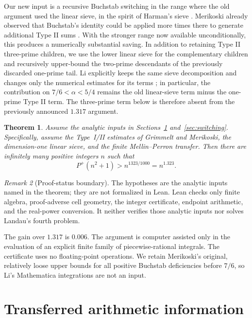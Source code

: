 \documentclass[10pt,reqno]{amsart}
\newcommand{\Pplus}{P^{+}}
\newcommand{\1}{\mathbf{1}}
\theoremstyle{plain}
\newtheorem{theorem}{Theorem}[section]
\theoremstyle{remark}
\newtheorem{remark}[theorem]{Remark}
\begin{document}
Our new input is a recursive Buchstab switching in the range where the old
argument used the linear sieve, in the spirit of Harman's sieve
\cite{Harman2007}.  Merikoski already observed that Buchstab's
identity could be applied more times there to generate additional Type II
sums \cite[Remark 12]{Merikoski2020}.  With the stronger range now available
unconditionally, this produces a numerically substantial saving.  In
addition to retaining Type II three-prime children, we use the lower linear
sieve for the complementary children and recursively upper-bound the
two-prime descendants of the previously discarded one-prime tail.
Li explicitly keeps the same sieve decomposition and changes only the
numerical estimates for its terms \cite[Lemmas 2.1 and 2.2]{Li2025}; in particular,
the contribution on $7/6<\alpha<5/4$ remains the old linear-sieve term minus
the one-prime Type II term.  The three-prime term below is therefore absent
from the previously announced $1.317$ argument.

\begin{theorem}\label{thm:main}
Assume the analytic inputs in Sections~\ref{sec:transfer}
and~\ref{sec:switching}.  Specifically, assume the Type~I/II estimates of
Grimmelt and Merikoski, the dimension-one linear sieve, and the finite
Mellin--Perron transfer.  Then there are
infinitely many positive integers $n$ such that
\[
  \Pplus(n^2+1)>n^{1323/1000}=n^{1.323}.
\]
\end{theorem}

\begin{remark}[Proof-status boundary]
The hypotheses are the analytic inputs named in the theorem; they are not
formalized in Lean.  Lean checks only finite algebra, proof-adverse cell
geometry, the integer certificate, endpoint arithmetic, and the real-power
conversion.  It neither verifies those analytic inputs nor solves Landau's
fourth problem.
\end{remark}

The gain over $1.317$ is $0.006$.  The argument is computer assisted only in
the evaluation of an explicit finite family of piecewise-rational integrals.
The certificate uses no floating-point operations.  We retain Merikoski's
original, relatively loose upper bounds for all positive Buchstab deficiencies
before $7/6$, so Li's Mathematica integrations are not an input.

\section{Transferred arithmetic information}\label{sec:transfer}
\end{document}
